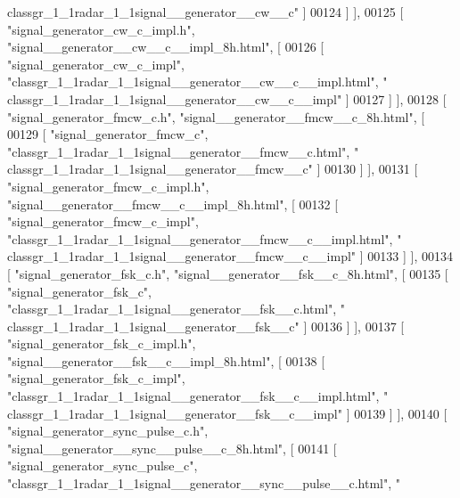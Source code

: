 \begin{DoxyCode}
{      classgr\_1\_1radar\_1\_1signal\_\_generator\_\_cw\_\_c"} ]
00124     ] ],
00125     [ \textcolor{stringliteral}{"signal\_generator\_cw\_c\_impl.h"}, \textcolor{stringliteral}{"signal\_\_generator\_\_cw\_\_c\_\_impl\_8h.html"}, [
00126       [ \textcolor{stringliteral}{"signal\_generator\_cw\_c\_impl"}, \textcolor{stringliteral}{"classgr\_1\_1radar\_1\_1signal\_\_generator\_\_cw\_\_c\_\_impl.html"}, \textcolor{stringliteral}{"
      classgr\_1\_1radar\_1\_1signal\_\_generator\_\_cw\_\_c\_\_impl"} ]
00127     ] ],
00128     [ \textcolor{stringliteral}{"signal\_generator\_fmcw\_c.h"}, \textcolor{stringliteral}{"signal\_\_generator\_\_fmcw\_\_c\_8h.html"}, [
00129       [ \textcolor{stringliteral}{"signal\_generator\_fmcw\_c"}, \textcolor{stringliteral}{"classgr\_1\_1radar\_1\_1signal\_\_generator\_\_fmcw\_\_c.html"}, \textcolor{stringliteral}{"
      classgr\_1\_1radar\_1\_1signal\_\_generator\_\_fmcw\_\_c"} ]
00130     ] ],
00131     [ \textcolor{stringliteral}{"signal\_generator\_fmcw\_c\_impl.h"}, \textcolor{stringliteral}{"signal\_\_generator\_\_fmcw\_\_c\_\_impl\_8h.html"}, [
00132       [ \textcolor{stringliteral}{"signal\_generator\_fmcw\_c\_impl"}, \textcolor{stringliteral}{"classgr\_1\_1radar\_1\_1signal\_\_generator\_\_fmcw\_\_c\_\_impl.html"}, \textcolor{stringliteral}{"
      classgr\_1\_1radar\_1\_1signal\_\_generator\_\_fmcw\_\_c\_\_impl"} ]
00133     ] ],
00134     [ \textcolor{stringliteral}{"signal\_generator\_fsk\_c.h"}, \textcolor{stringliteral}{"signal\_\_generator\_\_fsk\_\_c\_8h.html"}, [
00135       [ \textcolor{stringliteral}{"signal\_generator\_fsk\_c"}, \textcolor{stringliteral}{"classgr\_1\_1radar\_1\_1signal\_\_generator\_\_fsk\_\_c.html"}, \textcolor{stringliteral}{"
      classgr\_1\_1radar\_1\_1signal\_\_generator\_\_fsk\_\_c"} ]
00136     ] ],
00137     [ \textcolor{stringliteral}{"signal\_generator\_fsk\_c\_impl.h"}, \textcolor{stringliteral}{"signal\_\_generator\_\_fsk\_\_c\_\_impl\_8h.html"}, [
00138       [ \textcolor{stringliteral}{"signal\_generator\_fsk\_c\_impl"}, \textcolor{stringliteral}{"classgr\_1\_1radar\_1\_1signal\_\_generator\_\_fsk\_\_c\_\_impl.html"}, \textcolor{stringliteral}{"
      classgr\_1\_1radar\_1\_1signal\_\_generator\_\_fsk\_\_c\_\_impl"} ]
00139     ] ],
00140     [ \textcolor{stringliteral}{"signal\_generator\_sync\_pulse\_c.h"}, \textcolor{stringliteral}{"signal\_\_generator\_\_sync\_\_pulse\_\_c\_8h.html"}, [
00141       [ \textcolor{stringliteral}{"signal\_generator\_sync\_pulse\_c"}, \textcolor{stringliteral}{"classgr\_1\_1radar\_1\_1signal\_\_generator\_\_sync\_\_pulse\_\_c.html"}, \textcolor{stringliteral}{"
}
\end{DoxyCode}

